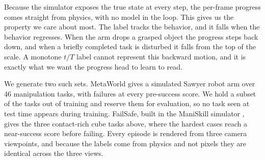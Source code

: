 Because the simulator exposes the true state at every step, the per-frame progress comes straight from physics, with no model in the loop. This gives us the property we care about most. The label tracks the behavior, and it falls when the behavior regresses. When the arm drops a grasped object the progress steps back down, and when a briefly completed task is disturbed it falls from the top of the scale. A monotone $t/T$ label cannot represent this backward motion, and it is exactly what we want the progress head to learn to read.

We generate two such sets. MetaWorld \citep{yu_meta-world_2019, mclean_meta-world_2025} gives a simulated Sawyer robot arm over 46 manipulation tasks, with failures at every pre-success score. We hold a subset of the tasks out of training and reserve them for evaluation, so no task seen at test time appears during training. FailSafe, built in the ManiSkill simulator \citep{mu_maniskill_2021, tao_maniskill3_2024}, gives the three contact-rich cube tasks above, where the hardest cases reach a near-success score before failing. Every episode is rendered from three camera viewpoints, and because the labels come from physics and not pixels they are identical across the three views.


